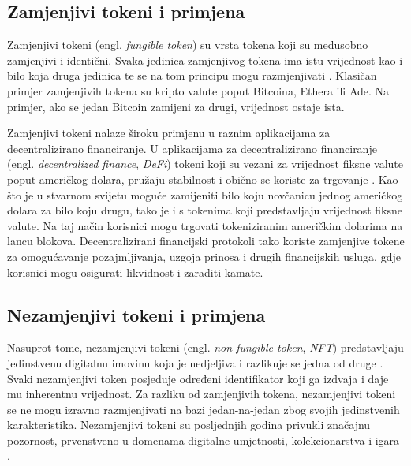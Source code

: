 \documentclass[times, utf8, diplomski]{fer}
\begin{document}
\subsection{Zamjenjivi tokeni i primjena}

Zamjenjivi tokeni (engl. \emph{fungible token}) su vrsta tokena koji su međusobno zamjenjivi i identični. Svaka jedinica zamjenjivog tokena ima istu vrijednost kao i bilo koja druga jedinica te se na tom principu mogu razmjenjivati \cite{bauer2022erc}. Klasičan primjer zamjenjivih tokena su kripto valute poput Bitcoina, Ethera ili Ade. Na primjer, ako se jedan Bitcoin zamijeni za drugi, vrijednost ostaje ista.

Zamjenjivi tokeni nalaze široku primjenu u raznim aplikacijama za decentralizirano financiranje. U aplikacijama za decentralizirano financiranje (engl. \emph{decentralized finance}, \emph{DeFi}) tokeni koji su vezani za vrijednost fiksne valute poput američkog dolara, pružaju stabilnost i obično se koriste za trgovanje \cite{schar2021decentralized}. Kao što je u stvarnom svijetu moguće zamijeniti bilo koju novčanicu jednog američkog dolara za bilo koju drugu, tako je i s tokenima koji predstavljaju vrijednost fiksne valute. Na taj način korisnici mogu trgovati tokeniziranim američkim dolarima na lancu blokova. Decentralizirani financijski protokoli tako koriste zamjenjive tokene za omogućavanje pozajmljivanja, uzgoja prinosa i drugih financijskih usluga, gdje korisnici mogu osigurati likvidnost i zaraditi kamate.

\subsection{Nezamjenjivi tokeni i primjena}

Nasuprot tome, nezamjenjivi tokeni (engl. \emph{non-fungible token}, \emph{NFT}) predstavljaju jedinstvenu digitalnu imovinu koja je nedjeljiva i razlikuje se jedna od druge \cite{wang2021non}. Svaki nezamjenjivi token posjeduje određeni identifikator koji ga izdvaja i daje mu inherentnu vrijednost. Za razliku od zamjenjivih tokena, nezamjenjivi tokeni se ne mogu izravno razmjenjivati na bazi jedan-na-jedan zbog svojih jedinstvenih karakteristika. Nezamjenjivi tokeni su posljednjih godina privukli značajnu pozornost, prvenstveno u domenama digitalne umjetnosti, kolekcionarstva i igara \cite{ante2022non}.
\end{document}
